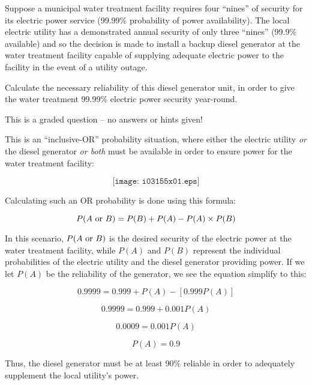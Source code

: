 

Suppose a municipal water treatment facility requires four ``nines'' of security for its electric power service (99.99\% probability of power availability).  The local electric utility has a demonstrated annual security of only three ``nines'' (99.9\% available) and so the decision is made to install a backup diesel generator at the water treatment facility capable of supplying adequate electric power to the facility in the event of a utility outage.

Calculate the necessary reliability of this diesel generator unit, in order to give the water treatment 99.99\% electric power security year-round.

\vfil 

\eject






This is a graded question -- no answers or hints given!







This is an ``inclusive-OR'' probability situation, where either the electric utility {\it or} the diesel generator {\it or both} must be available in order to ensure power for the water treatment facility:

$$\texttt{[image: i03155x01.eps]}$$

Calculating such an OR probability is done using this formula:

$$P(A \hbox{ or } B) = P(B) + P(A) - P(A) \times P(B)$$

In this scenario, $P(A \hbox{ or } B)$ is the desired security of the electric power at the water treatment facility, while $P(A)$ and $P(B)$ represent the individual probabilities of the electric utility and the diesel generator providing power.  If we let $P(A)$ be the reliability of the generator, we see the equation simplify to this:

$$0.9999 = 0.999 + P(A) - \left[ 0.999 P(A)\right]$$

$$0.9999 = 0.999 + 0.001 P(A)$$

$$0.0009 = 0.001 P(A)$$

$$P(A) = 0.9$$

Thus, the diesel generator must be at least 90\% reliable in order to adequately supplement the local utility's power.



